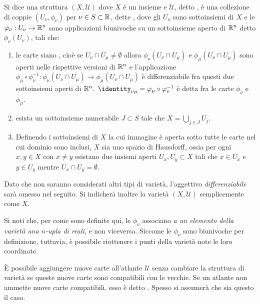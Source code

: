 \begin{definition}
  Si dice  una struttura $(X,\mathcal{U})$ dove $X$ è un insieme e $\mathcal{U}$, detto , è una collezione di coppie $(U_{\nu}, \phi_{\nu})$ per $\nu \in S \subset \mathbb{R}$, dette , dove gli $U_{\nu}$ sono sottoinsiemi di $X$ e le $\varphi_{\nu}:U_{\nu}\to \mathbb{R}^{n}$ sono applicazioni biunivoche su un sottoinsieme aperto di $\mathbb{R}^{n}$ detto $\phi_{\nu}(U_{\nu})$, tali che:
  \begin{enumerate}
    \item le carte siano , cioè se $U_{\nu} \cap U_{\mu} \neq \emptyset$ allora $\phi_{\nu}(U_{\nu} \cap U_{\mu})$ e $\phi_{\mu}(U_{\nu} \cap U_{\mu})$ sono aperti nelle rispettive versioni di $\mathbb{R}^{n}$ e l'applicazione $\phi_{\mu} \circ \phi_{\nu}^{-1}: \phi_{\nu}(U_{\nu} \cap U_{\mu}) \to \phi_{\mu}(U_{\nu} \cap U_{\mu})$ è differenziabile fra questi due sottoinsiemi aperti di $\mathbb{R}^{n}$. $\identity_{\nu\mu} = \phi_{\mu} \circ \phi_{\nu}^{-1}$ è detta  fra le carte $\phi_{\nu}$ e $\phi_{\mu}$.
    \item esista un sottoinsieme numerabile $J \subset S$ tale che $X = \bigcup_{j \in  J} U_j$.
    \item Definendo  i sottoinsiemi di $X$ la cui immagine è aperta sotto tutte le carte nel cui dominio sono inclusi, $X$ sia uno spazio di Hausdorff, ossia per ogni $x,y \in X$ con $x \neq y$ esistano due insiemi aperti $U_x, U_y \subset X$ tali che $x \in U_x$ e $y \in  U_y$ mentre $U_x \cap U_y = \emptyset$.
  \end{enumerate}
   Dato che non saranno considerati altri tipi di varietà, l'aggettivo \emph{differenziabile} sarà omesso nel seguito. Si indicherà inoltre la varietà $(X,\mathcal{U})$ semplicemente come $X$.
\end{definition}
\begin{remark}
  Si noti che, per come sono definite qui, le $\phi_{\nu}$ associano \emph{a un elemento della varietà una $n$-upla di reali}, e non viceversa. Siccome le $\phi_{\nu}$ sono biunivoche per definizione, tuttavia, è possibile riottenere i punti della varietà note le loro coordinate.
\end{remark}
\begin{remark}
  È possibile aggiungere nuove carte all'atlante $\mathcal{U}$ senza cambiare la struttura di varietà se queste nuove carte sono compatibili con le vecchie. Se un atlante non ammette nuove carte compatibili, esso è detto . Spesso si assumerà che sia questo il caso.
\end{remark}
